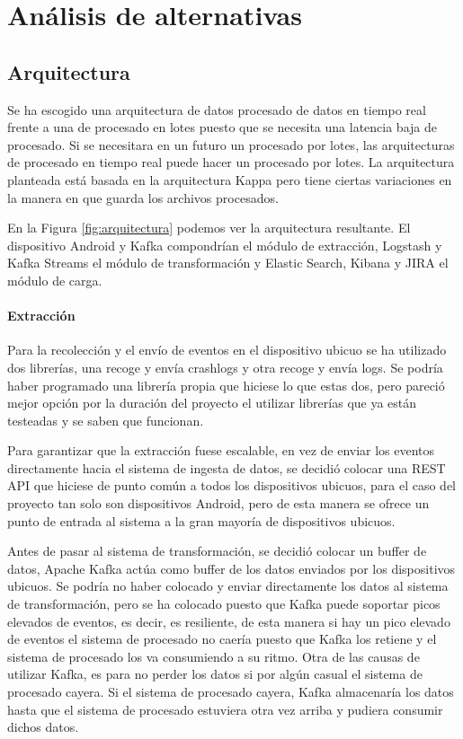 \chapter{Análisis de alternativas}

\section{Arquitectura}

Se ha escogido una arquitectura de datos procesado de datos en tiempo real frente a una de procesado en lotes puesto que se necesita una latencia baja de procesado. Si se necesitara en un futuro un procesado por lotes, las arquitecturas de procesado en tiempo real puede hacer un procesado por lotes. La arquitectura planteada está basada en la arquitectura Kappa pero tiene ciertas variaciones en la manera en que guarda los archivos procesados.

En la Figura \ref{fig:arquitectura} podemos ver la arquitectura resultante. El dispositivo Android y Kafka compondrían el módulo de extracción, Logstash y Kafka Streams el módulo de transformación y Elastic Search, Kibana y JIRA el módulo de carga.

\subsubsection{Extracción}

Para la recolección y el envío de eventos en el dispositivo ubicuo se ha utilizado dos librerías, una recoge y envía crashlogs y otra recoge y envía logs. Se podría haber programado una librería propia que hiciese lo que estas dos, pero pareció mejor opción por la duración del proyecto el utilizar librerías que ya están testeadas y se saben que funcionan. 

Para garantizar que la extracción fuese escalable, en vez de enviar los eventos directamente hacia el sistema de ingesta de datos, se decidió colocar una REST API que hiciese de punto común a todos los dispositivos ubicuos, para el caso del proyecto tan solo son dispositivos Android, pero de esta manera se ofrece un punto de entrada al sistema a la gran mayoría de dispositivos ubicuos.

Antes de pasar al sistema de transformación, se decidió colocar un buffer de datos, Apache Kafka actúa como buffer de los datos enviados por los dispositivos ubicuos. Se podría no haber colocado y enviar directamente los datos al sistema de transformación, pero se ha colocado puesto que Kafka puede soportar picos elevados de eventos, es decir, es resiliente, de esta manera si hay un pico elevado de eventos el sistema de procesado no caería puesto que Kafka los retiene y el sistema de procesado los va consumiendo a su ritmo. Otra de las causas de utilizar Kafka, es para no perder los datos si por algún casual el sistema de procesado cayera. Si el sistema de procesado cayera, Kafka almacenaría los datos hasta que el sistema de procesado estuviera otra vez arriba y pudiera consumir dichos datos.

